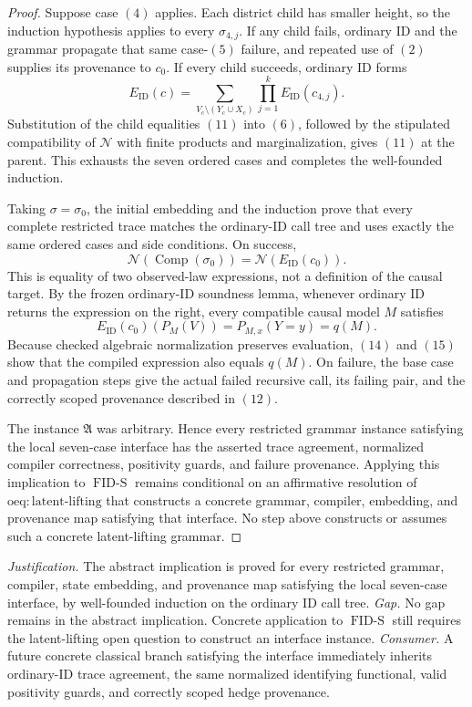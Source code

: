 \documentclass{article}
\begin{document}
\begin{proof}
Suppose case \((4)\) applies.  Each district child has smaller height, so the induction hypothesis applies to every \(\sigma_{4,j}\).  If any child fails, ordinary ID and the grammar propagate that same case-\((5)\) failure, and repeated use of \((2)\) supplies its provenance to \(c_0\).  If every child succeeds, ordinary ID forms
\[
 E_{\mathrm{ID}}(c)
 =\sum_{V_c\setminus(Y_c\cup X_c)}
   \prod_{j=1}^{k}E_{\mathrm{ID}}(c_{4,j}).
 \tag{13}
\]
Substitution of the child equalities \((11)\) into \((6)\), followed by the stipulated compatibility of \(\mathcal N\) with finite products and marginalization, gives \((11)\) at the parent.  This exhausts the seven ordered cases and completes the well-founded induction.

Taking \(\sigma=\sigma_0\), the initial embedding and the induction prove that every complete restricted trace matches the ordinary-ID call tree and uses exactly the same ordered cases and side conditions.  On success,
\[
 \mathcal N(\operatorname{Comp}(\sigma_0))
 =\mathcal N(E_{\mathrm{ID}}(c_0)).
 \tag{14}
\]
This is equality of two observed-law expressions, not a definition of the causal target.  By the frozen ordinary-ID soundness lemma, whenever ordinary ID returns the expression on the right, every compatible causal model \(M\) satisfies
\[
 E_{\mathrm{ID}}(c_0)(P_M(V))
 =P_{M,x}(Y=y)=q(M).
 \tag{15}
\]
Because checked algebraic normalization preserves evaluation, \((14)\) and \((15)\) show that the compiled expression also equals \(q(M)\).  On failure, the base case and propagation steps give the actual failed recursive call, its failing pair, and the correctly scoped provenance described in \((12)\).

The instance \(\mathfrak A\) was arbitrary.  Hence every restricted grammar instance satisfying the local seven-case interface has the asserted trace agreement, normalized compiler correctness, positivity guards, and failure provenance.  Applying this implication to \(\operatorname{FID\text{-}S}\) remains conditional on an affirmative resolution of \(\mathrm{oeq:latent\text{-}lifting}\) that constructs a concrete grammar, compiler, embedding, and provenance map satisfying that interface.  No step above constructs or assumes such a concrete latent-lifting grammar.
\end{proof}
\par\smallskip\noindent \textit{Justification.} The abstract implication is proved for every restricted grammar, compiler, state embedding, and provenance map satisfying the local seven-case interface, by well-founded induction on the ordinary ID call tree. \textit{Gap.} No gap remains in the abstract implication. Concrete application to \(\operatorname{FID\text{-}S}\) still requires the latent-lifting open question to construct an interface instance. \textit{Consumer.} A future concrete classical branch satisfying the interface immediately inherits ordinary-ID trace agreement, the same normalized identifying functional, valid positivity guards, and correctly scoped hedge provenance.
\end{document}
